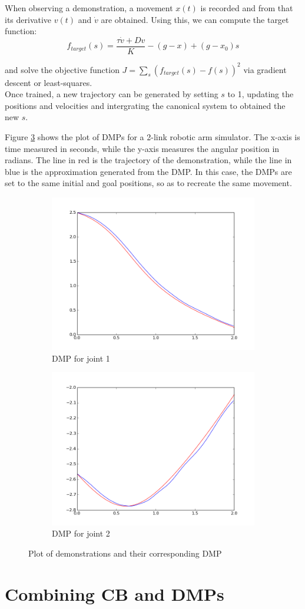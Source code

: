 \documentclass[a4paper]{article}
\begin{document}
When observing a demonstration, a movement $x(t)$ is recorded and from that its derivative $v(t)$ and $\dot{v}$ are obtained. Using this, we can compute the target function:
$$
f_{target}(s) = \frac{\tau \dot{v} + Dv}{K} - (g - x) + (g - x_0) s
$$ 

and solve the objective function $J = \sum_s (f_{target}(s) - f(s))^2$ via gradient descent or least-squares. \\
\indent Once trained, a new trajectory can be generated by setting $s$ to 1, updating the positions and velocities and intergrating the canonical system to obtained the new $s$.

Figure \ref{fig:test} shows the plot of DMPs for a 2-link robotic arm simulator. The x-axis is time measured in seconds, while the y-axis measures the angular position in radians. The line in red is the trajectory of the demonstration, while the line in blue is the approximation generated from the DMP. In this case, the DMPs are set to the same initial and goal positions, so as to recreate the same movement.  
 
 
\begin{figure}
\centering
\begin{subfigure}{.5\textwidth}
  \centering
  \includegraphics[width=.8\linewidth]{figure_1.png}
  \caption{DMP for joint 1}
  \label{fig:sub1}
\end{subfigure}%
\begin{subfigure}{.5\textwidth}
  \centering
  \includegraphics[width=.8\linewidth]{figure_2.png}
  \caption{DMP for joint 2}
  \label{fig:sub2}
\end{subfigure}
\caption{Plot of demonstrations and their corresponding DMP}
\label{fig:test}
\end{figure}

\section{Combining CB and DMPs}
 
 
\end{document}
